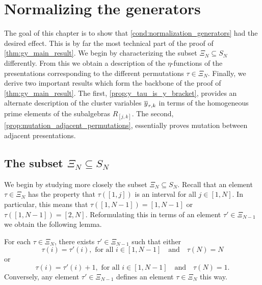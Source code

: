 \section{Normalizing the generators}\label{sec:normalizing_generators}

The goal of this chapter is to show that \cref{cond:normalization_generators} had the
desired effect. This is by far the most technical part of the proof of
\cref{thm:gy_main_result}. We begin by characterizing the subset $\Xi_N \subseteq S_N$
differently. From this we obtain a description of the $\eta$-functions of the
presentations corresponding to the different permutations $\tau \in \Xi_N$. Finally, we
derive two important results which form the backbone of the proof of
\cref{thm:gy_main_result}. The first, \cref{prop:y_tau_is_y_bracket}, provides an
alternate description of the cluster variables $\overline{y}_{\tau, k}$ in terms of the
homogeneous prime elements of the subalgebras $R_{[j, k]}$. The second,
\cref{prop:mutation_adjacent_permutations}, essentially proves mutation between
adjacent presentations.

\subsection{The subset \texorpdfstring{$\Xi_N \subseteq S_N$}{Xi\_ N of S\_ N}}

We begin by studying more closely the subset $\Xi_N \subseteq S_N$. Recall that an
element $\tau \in \Xi_N$ has the property that $\tau([1, j])$ is an interval for all $j
	\in [1, N]$. In particular, this means that $\tau([1, N-1]) = [1, N-1]$ or $\tau([1,
		N-1]) = [2, N]$. Reformulating this in terms of an element $\tau' \in \Xi_{N-1}$ we
obtain the following lemma.
\begin{lemma}
	For each $\tau \in \Xi_N$, there exists $\tau' \in \Xi_{N-1}$ such that either
	\begin{equation*}
		\tau(i) = \tau'(i), \text{ for all } i \in [1, N-1] \quad \text{and} \quad \tau(N) = N
	\end{equation*}
	or
	\begin{equation*}
		\tau(i) = \tau'(i) + 1, \text{ for all } i \in [1, N-1] \quad \text{and} \quad \tau(N) = 1.
	\end{equation*}
	Conversely, any element $\tau' \in \Xi_{N-1}$ defines an element $\tau \in \Xi_N$ this
	way.
\end{lemma}

